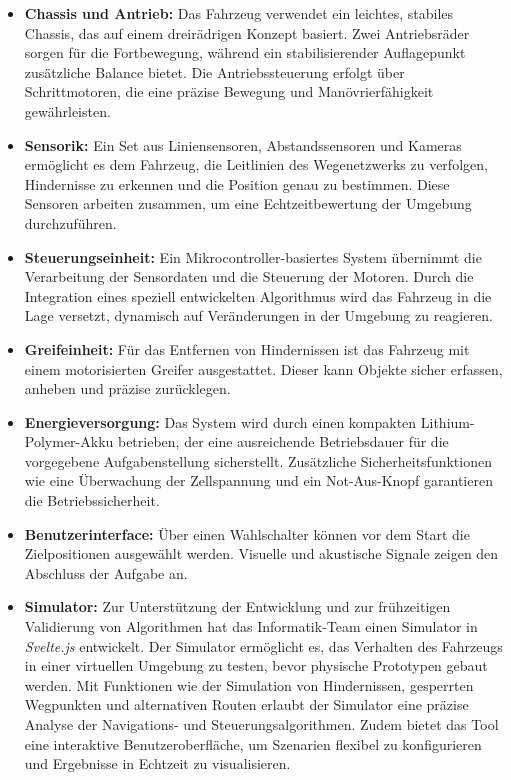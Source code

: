 \documentclass[main.tex]{subfiles} %
\begin{document}
\begin{itemize}
    \item \textbf{Chassis und Antrieb:} Das Fahrzeug verwendet ein leichtes, stabiles Chassis, das auf einem dreirädrigen Konzept basiert. Zwei Antriebsräder sorgen für die Fortbewegung, während ein stabilisierender Auflagepunkt zusätzliche Balance bietet. Die Antriebssteuerung erfolgt über Schrittmotoren, die eine präzise Bewegung und Manövrierfähigkeit gewährleisten.

    \item \textbf{Sensorik:} Ein Set aus Liniensensoren, Abstandssensoren und Kameras ermöglicht es dem Fahrzeug, die Leitlinien des Wegenetzwerks zu verfolgen, Hindernisse zu erkennen und die Position genau zu bestimmen. Diese Sensoren arbeiten zusammen, um eine Echtzeitbewertung der Umgebung durchzuführen.

    \item \textbf{Steuerungseinheit:} Ein Mikrocontroller-basiertes System übernimmt die Verarbeitung der Sensordaten und die Steuerung der Motoren. Durch die Integration eines speziell entwickelten Algorithmus wird das Fahrzeug in die Lage versetzt, dynamisch auf Veränderungen in der Umgebung zu reagieren.

    \item \textbf{Greifeinheit:} Für das Entfernen von Hindernissen ist das Fahrzeug mit einem motorisierten Greifer ausgestattet. Dieser kann Objekte sicher erfassen, anheben und präzise zurücklegen.

    \item \textbf{Energieversorgung:} Das System wird durch einen kompakten Lithium-Polymer-Akku betrieben, der eine ausreichende Betriebsdauer für die vorgegebene Aufgabenstellung sicherstellt. Zusätzliche Sicherheitsfunktionen wie eine Überwachung der Zellspannung und ein Not-Aus-Knopf garantieren die Betriebssicherheit.

    \item \textbf{Benutzerinterface:} Über einen Wahlschalter können vor dem Start die Zielpositionen ausgewählt werden. Visuelle und akustische Signale zeigen den Abschluss der Aufgabe an.

    \item \textbf{Simulator:} Zur Unterstützung der Entwicklung und zur frühzeitigen Validierung von Algorithmen hat das Informatik-Team einen Simulator in \textit{Svelte.js} entwickelt. Der Simulator ermöglicht es, das Verhalten des Fahrzeugs in einer virtuellen Umgebung zu testen, bevor physische Prototypen gebaut werden. Mit Funktionen wie der Simulation von Hindernissen, gesperrten Wegpunkten und alternativen Routen erlaubt der Simulator eine präzise Analyse der Navigations- und Steuerungsalgorithmen. Zudem bietet das Tool eine interaktive Benutzeroberfläche, um Szenarien flexibel zu konfigurieren und Ergebnisse in Echtzeit zu visualisieren.
\end{itemize}
\end{document}
